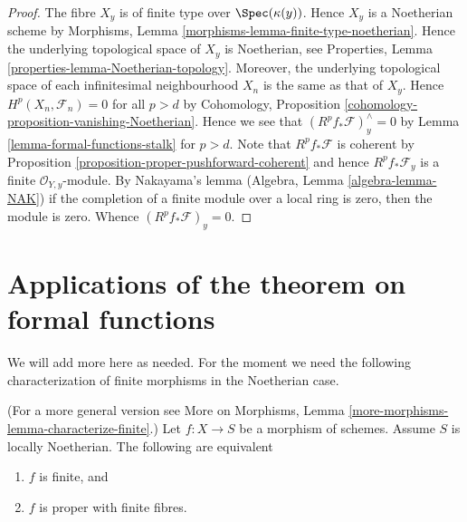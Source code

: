 \begin{proof}
The fibre $X_y$ is of finite type over $\Spec(\kappa(y))$.
Hence $X_y$ is a Noetherian scheme by
Morphisms, Lemma \ref{morphisms-lemma-finite-type-noetherian}.
Hence the underlying topological space of $X_y$ is Noetherian, see
Properties, Lemma \ref{properties-lemma-Noetherian-topology}.
Moreover, the underlying topological space of each infinitesimal
neighbourhood $X_n$ is the same as that of $X_y$.
Hence $H^p(X_n, \mathcal{F}_n) = 0$ for all $p > d$ by
Cohomology, Proposition \ref{cohomology-proposition-vanishing-Noetherian}.
Hence we see that $(R^pf_*\mathcal{F})_y^\wedge = 0$
by Lemma \ref{lemma-formal-functions-stalk} for $p > d$.
Note that $R^pf_*\mathcal{F}$ is coherent by
Proposition \ref{proposition-proper-pushforward-coherent} and
hence $R^pf_*\mathcal{F}_y$ is a finite
$\mathcal{O}_{Y, y}$-module. By Nakayama's lemma
(Algebra, Lemma \ref{algebra-lemma-NAK})
if the completion of a finite module over a local ring
is zero, then the module is zero. Whence
$(R^pf_*\mathcal{F})_y = 0$.
\end{proof}








\section{Applications of the theorem on formal functions}
\label{section-applications-formal-functions}


\noindent
We will add more here as needed. For the moment we need the
following characterization of finite morphisms in the Noetherian case.

\begin{lemma}
\label{lemma-characterize-finite}
(For a more general version see
More on Morphisms, Lemma \ref{more-morphisms-lemma-characterize-finite}.)
Let $f : X \to S$ be a morphism of schemes.
Assume $S$ is locally Noetherian.
The following are equivalent
\begin{enumerate}
\item $f$ is finite, and
\item $f$ is proper with finite fibres.
\end{enumerate}
\end{lemma}

